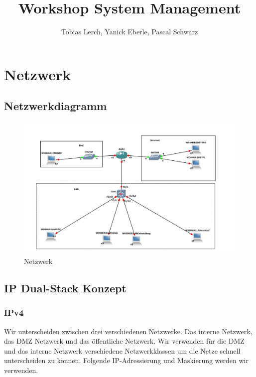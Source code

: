 \documentclass[11pt,a4paper,parskip=half]{scrartcl}
\title{Workshop System Management}
\author{Tobias Lerch, Yanick Eberle, Pascal Schwarz}
\begin{document}
\maketitle
\newpage

\tableofcontents
\newpage

\section{Netzwerk}
\subsection{Netzwerkdiagramm}
\begin{figure}[H]
\centering
\includegraphics[width=1.0\textwidth]{Phase1/Netz.PNG}
\caption{Netzwerk}
\label{fig:netzwerkdiagramm}
\end{figure}

\subsection{IP Dual-Stack Konzept}
\subsubsection{IPv4}
Wir unterscheiden zwischen drei verschiedenen Netzwerke. Das interne Netzwerk, das DMZ Netzwerk und das öffentliche Netzwerk. Wir verwenden für die DMZ und das interne Netzwerk verschiedene Netzwerkklassen um die Netze schnell unterscheiden zu können. Folgende IP-Adressierung und Maskierung werden wir verwenden.
\end{document}
